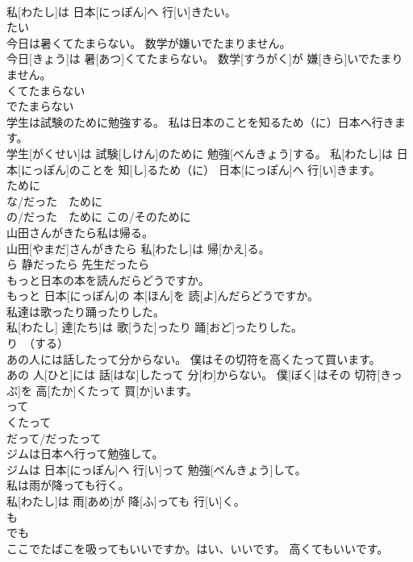 \documentclass[8pt]{extreport}
\begin{document}
\begin{CJK}{UTF8}{min}
\\	私[わたし]は 日本[にっぽん]へ 行[い]きたい。	
\\	たい	
\\	今日は暑くてたまらない。 数学が嫌いでたまりません。	
\\	今日[きょう]は 暑[あつ]くてたまらない。 数学[すうがく]が 嫌[きら]いでたまりません。	
\\	くてたまらない 
\\	でたまらない	
\\	学生は試験のために勉強する。 私は日本のことを知るため（に）日本へ行きます。	
\\	学生[がくせい]は 試験[しけん]のために 勉強[べんきょう]する。 私[わたし]は 日本[にっぽん]のことを 知[し]るため（に） 日本[にっぽん]へ 行[い]きます。	
\\	ために 
\\	な/だった　ために 
\\	の/だった　ために この/そのために　
\\	山田さんがきたら私は帰る。	
\\	山田[やまだ]さんがきたら 私[わたし]は 帰[かえ]る。	
\\	ら 静だったら 先生だったら	
\\	もっと日本の本を読んだらどうですか。	
\\	もっと 日本[にっぽん]の 本[ほん]を 読[よ]んだらどうですか。	
\\	私達は歌ったり踊ったりした。	
\\	私[わたし] 達[たち]は 歌[うた]ったり 踊[おど]ったりした。	
\\	り　（する）	
\\	あの人には話したって分からない。 僕はその切符を高くたって買います。	
\\	あの 人[ひと]には 話[はな]したって 分[わ]からない。 僕[ぼく]はその 切符[きっぷ]を 高[たか]くたって 買[か]います。	
\\	って 
\\	くたって 
\\	だって/だったって	
\\	ジムは日本へ行って勉強して。	
\\	ジムは 日本[にっぽん]へ 行[い]って 勉強[べんきょう]して。	
\\	私は雨が降っても行く。	
\\	私[わたし]は 雨[あめ]が 降[ふ]っても 行[い]く。	
\\	も 
\\	でも	
\\	ここでたばこを吸ってもいいですか。はい、いいです。 高くてもいいです。	

\end{CJK}
\end{document}
